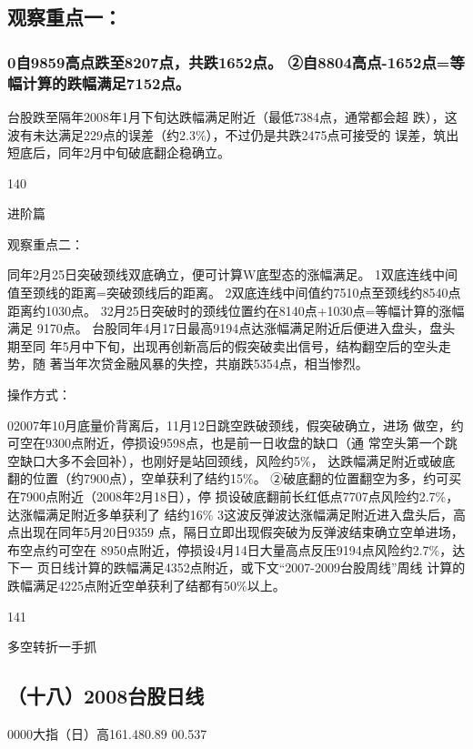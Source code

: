 \documentclass{article}
\begin{document}
\subsection{观察重点一：}

\subsubsection{0自9859高点跌至8207点，共跌1652点。 ②自8804高点-1652点=等幅计算的跌幅满足7152点。}

台股跌至隔年2008年1月下旬达跌幅满足附近（最低7384点，通常都会超 跌），这波有未达满足229点的误差（约2.3\%），不过仍是共跌2475点可接受的 误差，筑出短底后，同年2月中旬破底翻企稳确立。

140

\clearpage

进阶篇

观察重点二：

同年2月25日突破颈线双底确立，便可计算W底型态的涨幅满足。 1双底连线中间值至颈线的距离=突破颈线后的距离。 2双底连线中间值约7510点至颈线约8540点距离约1030点。 32月25日突破时的颈线位置约在8140点+1030点=等幅计算的涨幅满足 9170点。 台股同年4月17日最高9194点达涨幅满足附近后便进入盘头，盘头期至同 年5月中下旬，出现再创新高后的假突破卖出信号，结构翻空后的空头走势，随 著当年次贷金融风暴的失控，共崩跌5354点，相当惨烈。

操作方式：

02007年10月底量价背离后，11月12日跳空跌破颈线，假突破确立，进场 做空，约可空在9300点附近，停损设9598点，也是前一日收盘的缺口（通 常空头第一个跳空缺口大多不会回补），也刚好是站回颈线，风险约5\%， 达跌幅满足附近或破底翻的位置（约7900点），空单获利了结约15\%。 ②破底翻的位置翻空为多，约可买在7900点附近（2008年2月18日），停 损设破底翻前长红低点7707点风险约2.7\%，达涨幅满足附近多单获利了 结约16\% 3这波反弹波达涨幅满足附近进入盘头后，高点出现在同年5月20日9359 点，隔日立即出现假突破为反弹波结束确立空单进场，布空点约可空在 8950点附近，停损设4月14日大量高点反压9194点风险约2.7\%，达下一 页日线计算的跌幅满足4352点附近，或下文“2007-2009台股周线”周线 计算的跌幅满足4225点附近空单获利了结都有50\%以上。

141

\clearpage

多空转折一手抓

\subsection{（十八）2008台股日线}

0000大指（日）高161.480.89 00.537
\end{document}
